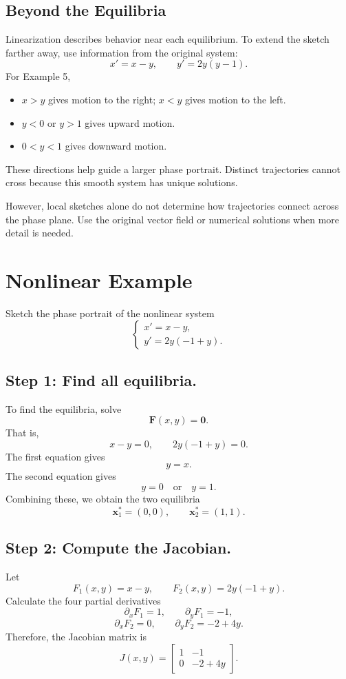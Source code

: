 \documentclass[10pt,letterpaper]{article}
\begin{document}
\subsection{Beyond the Equilibria}

Linearization describes behavior near each equilibrium.
To extend the sketch farther away, use information
from the original system:
\[
x'=x-y,\qquad y'=2y(y-1).
\]
For Example 5,
\begin{itemize}
    \item $x>y$ gives motion to the right;
    $x<y$ gives motion to the left.
    \item $y<0$ or $y>1$ gives upward motion.
    \item $0<y<1$ gives downward motion.
\end{itemize}

These directions help guide a larger phase portrait.
Distinct trajectories cannot cross because this smooth
system has unique solutions.

However, local sketches alone do not determine how
trajectories connect across the phase plane.
Use the original vector field or numerical solutions
when more detail is needed.


\section{Nonlinear Example}
Sketch the phase portrait of the nonlinear system
\[
\begin{cases}
x' = x - y,\\[3pt]
y' = 2y(-1+y).
\end{cases}
\]

\subsection*{Step 1: Find all equilibria.}
To find the equilibria, solve
\[
\mathbf{F}(x,y)=\mathbf{0}.
\]
That is,
\[
x-y=0,
\qquad
2y(-1+y)=0.
\]
The first equation gives
\[
y=x.
\]
The second equation gives
\[
y=0 \quad \text{or} \quad y=1.
\]
Combining these, we obtain the two equilibria
\[
\boxed{\mathbf{x}_1^*=(0,0),\qquad \mathbf{x}_2^*=(1,1).}
\]
\subsection*{Step 2: Compute the Jacobian.}
Let
\[
F_1(x,y)=x-y,
\qquad
F_2(x,y)=2y(-1+y).
\]
Calculate the four partial derivatives 
\[
\partial_x F_1 = 1,
\qquad
\partial_y F_1 = -1,
\]
\[
\partial_x F_2 = 0,
\qquad
\partial_y F_2 = -2+4y.
\]
Therefore, the Jacobian matrix is
\[
J(x,y)=
\begin{bmatrix}
1 & -1\\[3pt]
0 & -2+4y
\end{bmatrix}.
\]
\end{document}
